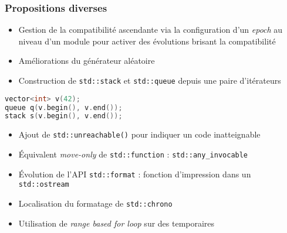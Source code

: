 \documentclass[C++.tex]{subfiles}
\begin{document}
\begin{frame}[fragile]
	\frametitle{Propositions diverses}
	\begin{itemize}
		\item Gestion de la compatibilité ascendante via la configuration d'un \textit{epoch} au niveau d'un module pour activer des évolutions brisant la compatibilité


		\item Améliorations du générateur aléatoire
		\item Construction de \lstinline|std::stack| et \lstinline|std::queue| depuis une paire d'itérateurs
	\end{itemize}

	\begin{lstlisting}[language=C++]
vector<int> v(42);
queue q(v.begin(), v.end());
stack s(v.begin(), v.end());\end{lstlisting}


	\begin{itemize}
		\item Ajout de \lstinline|std::unreachable()| pour indiquer un code inatteignable


		\item Équivalent \textit{move-only} de \lstinline|std::function| : \lstinline|std::any_invocable|
		\item Évolution de l'API \lstinline|std::format| : fonction d'impression dans un \lstinline|std::ostream|
		\item Localisation du formatage de \lstinline|std::chrono|
		\item Utilisation de \textit{range based for loop} sur des temporaires
	\end{itemize}
\end{frame}
\end{document}
